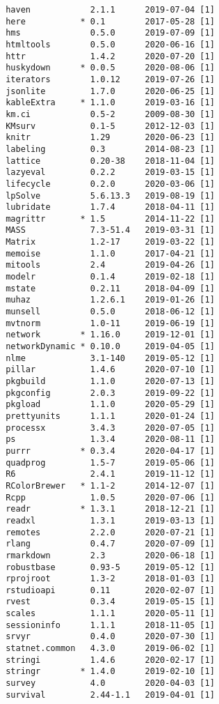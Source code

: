 \documentclass [11pt, proquest] {uwthesis}[2015/03/03]
\begin{document}
\begin{verbatim}
 haven            2.1.1      2019-07-04 [1]
 here           * 0.1        2017-05-28 [1]
 hms              0.5.0      2019-07-09 [1]
 htmltools        0.5.0      2020-06-16 [1]
 httr             1.4.2      2020-07-20 [1]
 huskydown      * 0.0.5      2020-08-06 [1]
 iterators        1.0.12     2019-07-26 [1]
 jsonlite         1.7.0      2020-06-25 [1]
 kableExtra     * 1.1.0      2019-03-16 [1]
 km.ci            0.5-2      2009-08-30 [1]
 KMsurv           0.1-5      2012-12-03 [1]
 knitr            1.29       2020-06-23 [1]
 labeling         0.3        2014-08-23 [1]
 lattice          0.20-38    2018-11-04 [1]
 lazyeval         0.2.2      2019-03-15 [1]
 lifecycle        0.2.0      2020-03-06 [1]
 lpSolve          5.6.13.3   2019-08-19 [1]
 lubridate        1.7.4      2018-04-11 [1]
 magrittr       * 1.5        2014-11-22 [1]
 MASS             7.3-51.4   2019-03-31 [1]
 Matrix           1.2-17     2019-03-22 [1]
 memoise          1.1.0      2017-04-21 [1]
 mitools          2.4        2019-04-26 [1]
 modelr           0.1.4      2019-02-18 [1]
 mstate           0.2.11     2018-04-09 [1]
 muhaz            1.2.6.1    2019-01-26 [1]
 munsell          0.5.0      2018-06-12 [1]
 mvtnorm          1.0-11     2019-06-19 [1]
 network        * 1.16.0     2019-12-01 [1]
 networkDynamic * 0.10.0     2019-04-05 [1]
 nlme             3.1-140    2019-05-12 [1]
 pillar           1.4.6      2020-07-10 [1]
 pkgbuild         1.1.0      2020-07-13 [1]
 pkgconfig        2.0.3      2019-09-22 [1]
 pkgload          1.1.0      2020-05-29 [1]
 prettyunits      1.1.1      2020-01-24 [1]
 processx         3.4.3      2020-07-05 [1]
 ps               1.3.4      2020-08-11 [1]
 purrr          * 0.3.4      2020-04-17 [1]
 quadprog         1.5-7      2019-05-06 [1]
 R6               2.4.1      2019-11-12 [1]
 RColorBrewer   * 1.1-2      2014-12-07 [1]
 Rcpp             1.0.5      2020-07-06 [1]
 readr          * 1.3.1      2018-12-21 [1]
 readxl           1.3.1      2019-03-13 [1]
 remotes          2.2.0      2020-07-21 [1]
 rlang            0.4.7      2020-07-09 [1]
 rmarkdown        2.3        2020-06-18 [1]
 robustbase       0.93-5     2019-05-12 [1]
 rprojroot        1.3-2      2018-01-03 [1]
 rstudioapi       0.11       2020-02-07 [1]
 rvest            0.3.4      2019-05-15 [1]
 scales           1.1.1      2020-05-11 [1]
 sessioninfo      1.1.1      2018-11-05 [1]
 srvyr            0.4.0      2020-07-30 [1]
 statnet.common   4.3.0      2019-06-02 [1]
 stringi          1.4.6      2020-02-17 [1]
 stringr        * 1.4.0      2019-02-10 [1]
 survey           4.0        2020-04-03 [1]
 survival         2.44-1.1   2019-04-01 [1]

\end{verbatim}
\end{document}
